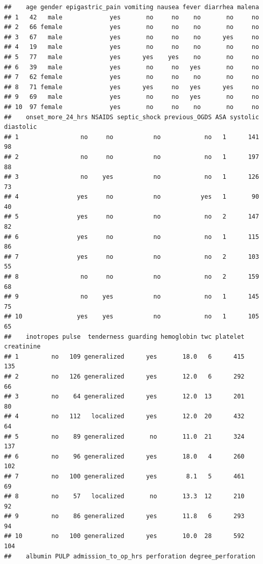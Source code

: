\documentclass[
  10pt,
]{krantz}
\begin{document}
\begin{verbatim}
##    age gender epigastric_pain vomiting nausea fever diarrhea malena
## 1   42   male             yes       no     no    no       no     no
## 2   66 female             yes       no     no    no       no     no
## 3   67   male             yes       no     no    no      yes     no
## 4   19   male             yes       no     no    no       no     no
## 5   77   male             yes      yes    yes    no       no     no
## 6   39   male             yes       no     no   yes       no     no
## 7   62 female             yes       no     no    no       no     no
## 8   71 female             yes      yes     no   yes      yes     no
## 9   69   male             yes       no     no   yes       no     no
## 10  97 female             yes       no     no    no       no     no
##    onset_more_24_hrs NSAIDS septic_shock previous_OGDS ASA systolic diastolic
## 1                 no     no           no            no   1      141        98
## 2                 no     no           no            no   1      197        88
## 3                 no    yes           no            no   1      126        73
## 4                yes     no           no           yes   1       90        40
## 5                yes     no           no            no   2      147        82
## 6                yes     no           no            no   1      115        86
## 7                yes     no           no            no   2      103        55
## 8                 no     no           no            no   2      159        68
## 9                 no    yes           no            no   1      145        75
## 10               yes    yes           no            no   1      105        65
##    inotropes pulse  tenderness guarding hemoglobin twc platelet creatinine
## 1         no   109 generalized      yes       18.0   6      415        135
## 2         no   126 generalized      yes       12.0   6      292         66
## 3         no    64 generalized      yes       12.0  13      201         80
## 4         no   112   localized      yes       12.0  20      432         64
## 5         no    89 generalized       no       11.0  21      324        137
## 6         no    96 generalized      yes       18.0   4      260        102
## 7         no   100 generalized      yes        8.1   5      461         69
## 8         no    57   localized       no       13.3  12      210         92
## 9         no    86 generalized      yes       11.8   6      293         94
## 10        no   100 generalized      yes       10.0  28      592        104
##    albumin PULP admission_to_op_hrs perforation degree_perforation

\end{verbatim}
\end{document}
